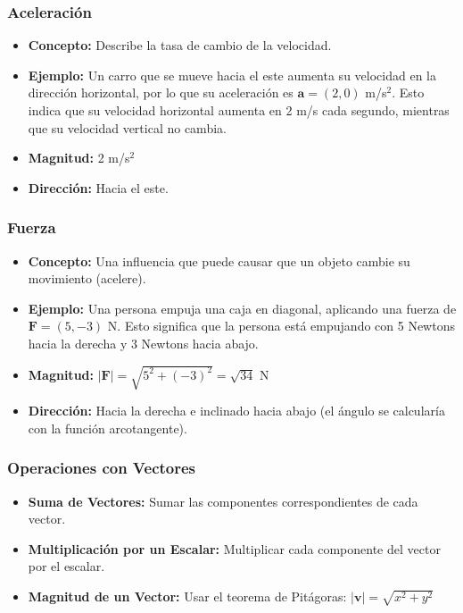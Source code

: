 \documentclass[11pt,a4paper]{article}
\begin{document}
\subsubsection{Aceleración}
\begin{itemize}
    \item \textbf{Concepto:} Describe la tasa de cambio de la velocidad.
    \item \textbf{Ejemplo:} Un carro que se mueve hacia el este aumenta su velocidad en la dirección horizontal, por lo que su aceleración es $\textbf{a} = (2, 0)$ m/s$^2$.  Esto indica que su velocidad horizontal aumenta en 2 m/s cada segundo, mientras que su velocidad vertical no cambia.
    \item \textbf{Magnitud:} 2 m/s$^2$
    \item \textbf{Dirección:} Hacia el este.
\end{itemize}

\subsubsection{Fuerza}
\begin{itemize}
    \item \textbf{Concepto:} Una influencia que puede causar que un objeto cambie su movimiento (acelere).
    \item \textbf{Ejemplo:} Una persona empuja una caja en diagonal, aplicando una fuerza de $\textbf{F} = (5, -3)$ N.  Esto significa que la persona está empujando con 5 Newtons hacia la derecha y 3 Newtons hacia abajo.
    \item \textbf{Magnitud:} $|\textbf{F}|=\sqrt{5^2+(-3)^2} = \sqrt{34}$ N
    \item \textbf{Dirección:} Hacia la derecha e inclinado hacia abajo (el ángulo se calcularía con la función arcotangente).
\end{itemize}

\subsubsection{Operaciones con Vectores}

\begin{itemize}
    \item \textbf{Suma de Vectores:} Sumar las componentes correspondientes de cada vector.
    \item \textbf{Multiplicación por un Escalar:} Multiplicar cada componente del vector por el escalar.
    \item \textbf{Magnitud de un Vector:} Usar el teorema de Pitágoras: $|\textbf{v}|=\sqrt{x^2+y^2}$
\end{itemize}
\end{document}
